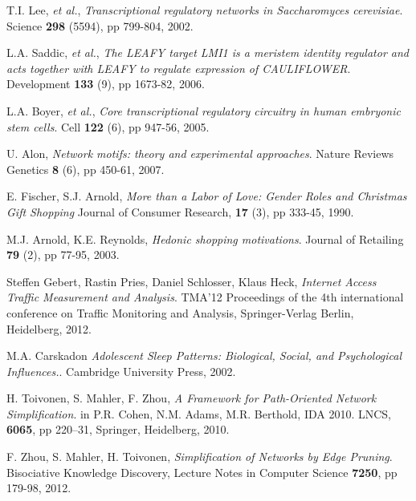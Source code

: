 \begin{thebibliography}{99}
  T.I. Lee, \emph{et al.},
  \emph{Transcriptional regulatory networks in Saccharomyces cerevisiae}.
  Science \textbf{298} (5594), pp 799-804,
  2002.

  L.A. Saddic, \emph{et al.},
  \emph{The LEAFY target LMI1 is a meristem identity regulator and acts together with LEAFY to regulate expression of CAULIFLOWER}.
  Development \textbf{133} (9), pp 1673-82,
  2006.

  L.A. Boyer, \emph{et al.},
  \emph{Core transcriptional regulatory circuitry in human embryonic stem cells}.
  Cell \textbf{122} (6), pp 947-56,
  2005.

  U. Alon,
  \emph{Network motifs: theory and experimental approaches}.
  Nature Reviews Genetics \textbf{8} (6), pp 450-61,
  2007.
  
  E. Fischer, S.J. Arnold,
  \emph{More than a Labor of Love: Gender Roles and Christmas Gift Shopping}
  Journal of Consumer Research, \textbf{17} (3), pp 333-45,
  1990.

  M.J. Arnold, K.E. Reynolds,
  \emph{Hedonic shopping motivations}.
  Journal of Retailing \textbf{79} (2), pp 77-95,
  2003.

  Steffen Gebert, Rastin Pries, Daniel Schlosser, Klaus Heck,
  \emph{Internet Access Traffic Measurement and Analysis}.
  TMA'12 Proceedings of the 4th international conference on Traffic Monitoring and Analysis,
  Springer-Verlag Berlin, Heidelberg,
  2012.

  M.A. Carskadon
  \emph{Adolescent Sleep Patterns: Biological, Social, and Psychological Influences.}.
  Cambridge University Press,
  2002.

  H. Toivonen, S. Mahler, F. Zhou,
  \emph{A Framework for Path-Oriented Network Simplification}.
  in P.R. Cohen, N.M. Adams, M.R. Berthold,
  IDA 2010. LNCS, \textbf{6065}, pp 220–31,
  Springer, Heidelberg,
  2010.

  F. Zhou, S. Mahler, H. Toivonen,
  \emph{Simplification of Networks by Edge Pruning}.
  Bisociative Knowledge Discovery,
  Lecture Notes in Computer Science \textbf{7250}, pp 179-98,
  2012.

\end{thebibliography}

